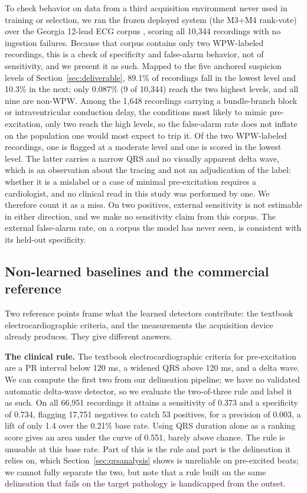 \documentclass[11pt]{article}
\begin{document}
To check behavior on data from a third acquisition environment never used in training or selection, we ran the frozen deployed system (the M3+M4 rank-vote) over the Georgia 12-lead ECG corpus \cite{georgia}, scoring all 10{,}344 recordings with no ingestion failures. Because that corpus contains only two WPW-labeled recordings, this is a check of specificity and false-alarm behavior, not of sensitivity, and we present it as such. Mapped to the five anchored suspicion levels of Section~\ref{sec:deliverable}, 89.1\% of recordings fall in the lowest level and 10.3\% in the next; only 0.087\% (9 of 10{,}344) reach the two highest levels, and all nine are non-WPW. Among the 1{,}648 recordings carrying a bundle-branch block or intraventricular conduction delay, the conditions most likely to mimic pre-excitation, only two reach the high levels, so the false-alarm rate does not inflate on the population one would most expect to trip it. Of the two WPW-labeled recordings, one is flagged at a moderate level and one is scored in the lowest level. The latter carries a narrow QRS and no visually apparent delta wave, which is an observation about the tracing and not an adjudication of the label: whether it is a mislabel or a case of minimal pre-excitation requires a cardiologist, and no clinical read in this study was performed by one. We therefore count it as a miss. On two positives, external sensitivity is not estimable in either direction, and we make no sensitivity claim from this corpus. The external false-alarm rate, on a corpus the model has never seen, is consistent with its held-out specificity.

\subsection{Non-learned baselines and the commercial reference}
\label{sec:baselines}

Two reference points frame what the learned detectors contribute: the textbook electrocardiographic criteria, and the measurements the acquisition device already produces. They give different answers.

\textbf{The clinical rule.} The textbook electrocardiographic criteria for pre-excitation are a PR interval below 120 ms, a widened QRS above 120 ms, and a delta wave. We can compute the first two from our delineation pipeline; we have no validated automatic delta-wave detector, so we evaluate the two-of-three rule and label it as such. On all 66{,}951 recordings it attains a sensitivity of 0.373 and a specificity of 0.734, flagging 17{,}751 negatives to catch 53 positives, for a precision of 0.003, a lift of only 1.4 over the 0.21\% base rate. Using QRS duration alone as a ranking score gives an area under the curve of 0.551, barely above chance. The rule is unusable at this base rate. Part of this is the rule and part is the delineation it relies on, which Section~\ref{sec:qrsanalysis} shows is unreliable on pre-excited beats; we cannot fully separate the two, but note that a rule built on the same delineation that fails on the target pathology is handicapped from the outset.
\end{document}
